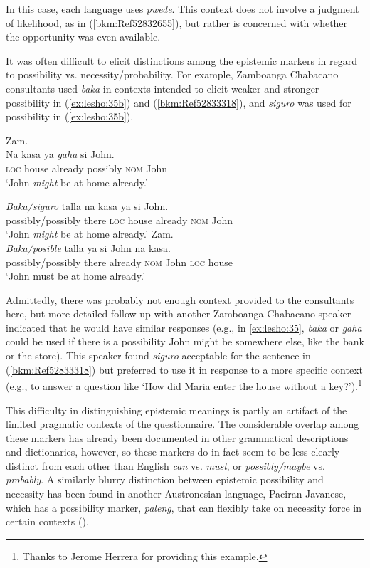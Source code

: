 \documentclass[output=paper,colorlinks,citecolor=brown]{langscibook}
\begin{document}
In this case, each language uses \textit{pwede}. This context does not involve a judgment of likelihood, as in (\ref{bkm:Ref52832655}), but rather is concerned with whether the opportunity was even available.

It was often difficult to elicit distinctions among the epistemic markers in regard to possibility vs. necessity/probability. For example, Zamboanga Chabacano consultants used \textit{baka} in contexts intended to elicit weaker and stronger possibility in (\ref{ex:lesho:35b}) and (\ref{bkm:Ref52833318}), and \textit{siguro} was used for possibility in (\ref{ex:lesho:35b}).\largerpage

\ea
\label{ex:lesho:35}
\ea \label {ex:lesho:35a}
{Zam.}\\
\gll Na            kasa ya \textit{gaha} si John.\\
     \textsc{loc} house already possibly \textsc{nom} John\\
\glt ‘John \textit{might} be at home already.’

\ex \label {ex:lesho:35b}
 
\gll \textit{Baka/siguro} talla na         kasa        ya  si        John.\\
     possibly/possibly   there \textsc{loc} house already \textsc{nom} John\\
\glt ‘John \textit{might} be at home already.’
\z
\ex
{\label{bkm:Ref52833318}Zam.}\\
\gll \textit{Baka/posible} talla ya si John na kasa.\\
    possibly/possibly there already \textsc{nom} John \textsc{loc} house\\
\glt `John must be at home already.'
\z

Admittedly, there was probably not enough context provided to the consultants here, but more detailed follow-up with another Zamboanga Chabacano speaker indicated that he would have similar responses (e.g., in \ref{ex:lesho:35}, \textit{baka} or \textit{gaha} could be used if there is a possibility John might be somewhere else, like the bank or the store). This speaker found \textit{siguro} acceptable for the sentence in (\ref{bkm:Ref52833318}) but preferred to use it in response to a more specific context (e.g., to answer a question like ‘How did Maria enter the house without a key?’).\footnote{Thanks to Jerome Herrera for providing this example.}

This difficulty in distinguishing epistemic meanings is partly an artifact of the limited pragmatic contexts of the questionnaire. The considerable overlap among these markers has already been documented in other grammatical descriptions and dictionaries, however, so these markers do in fact seem to be less clearly distinct from each other than English \textit{can} vs. \textit{must}, or \textit{possibly/maybe} vs. \textit{probably}. A similarly blurry distinction between epistemic possibility and necessity has been found in another Austronesian language, Paciran Javanese, which has a possibility marker, \textit{paleng}, that can flexibly take on necessity force in certain contexts (\citealt{VanderKlok2013}). 
\end{document}
